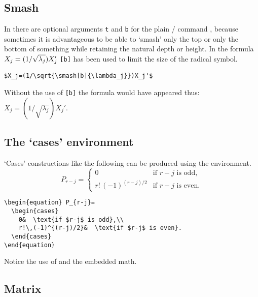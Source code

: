 \subsection{Smash}

In  there are optional arguments \verb"t" and
\verb"b" for the plain \tex/
command , because sometimes it is advantageous to be
able to `smash' only the top or only the bottom of something while
retaining the natural depth or height.  In the formula
 $X_j=(1/\sqrt{\smash[b]{\lambda_j}})X_j'$ \verb=[b]=
has been used to limit the size of the radical symbol.
\begin{verbatim}
$X_j=(1/\sqrt{\smash[b]{\lambda_j}})X_j'$
\end{verbatim}
Without the use of \verb=[b]= the formula would
have appeared thus: $X_j=(1/\sqrt{\lambda_j})X_j'$.

\subsection{The `cases' environment}
`Cases' constructions like the following can be produced using
the  environment.
\begin{equation}
P_{r-j}=
  \begin{cases}
    0&  \text{if $r-j$ is odd},\\
    r!\,(-1)^{(r-j)/2}&  \text{if $r-j$ is even}.
  \end{cases}
\end{equation}
\begin{verbatim}
\begin{equation} P_{r-j}=
  \begin{cases}
    0&  \text{if $r-j$ is odd},\\
    r!\,(-1)^{(r-j)/2}&  \text{if $r-j$ is even}.
  \end{cases}
\end{equation}
\end{verbatim}
Notice the use of  and the embedded math.

\subsection{Matrix}

